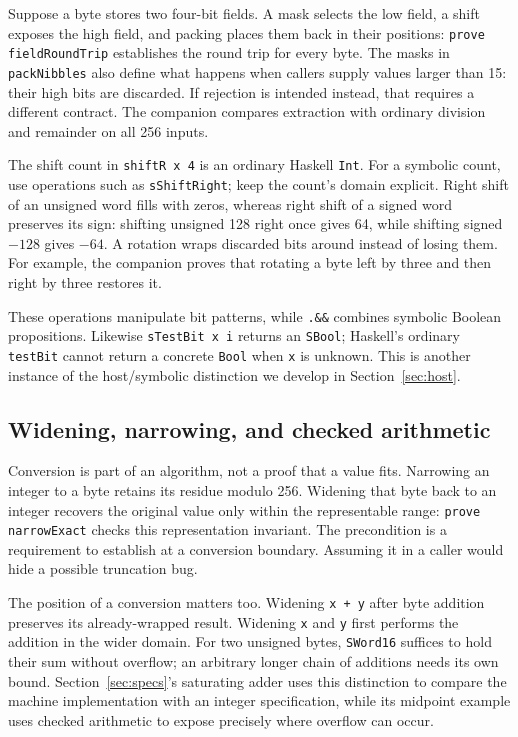 \documentclass[review]{jfp-epi}
\newcommand{\code}[1]{\texttt{#1}}
\begin{document}
Suppose a byte stores two four-bit fields. A mask selects the low field, a shift
exposes the high field, and packing places them back in their positions:
\code{prove fieldRoundTrip} establishes the round trip for every byte. The
masks in \code{packNibbles} also define what happens when callers supply values
larger than 15: their high bits are discarded. If rejection is intended instead,
that requires a different contract. The companion compares extraction with
ordinary division and remainder on all 256 inputs.

The shift count in \code{shiftR x 4} is an ordinary Haskell \code{Int}.
For a symbolic count, use operations such as \code{sShiftRight}; keep the
count's domain explicit. Right shift of an unsigned word fills with zeros,
whereas right shift of a signed word preserves its sign: shifting unsigned 128
right once gives 64, while shifting signed $-128$ gives $-64$.
A rotation wraps discarded bits around instead of losing them. For example,
the companion proves that rotating a byte left by three and then right by
three restores it.

These operations manipulate bit patterns, while \code{.\&\&} combines symbolic
Boolean propositions. Likewise \code{sTestBit x i} returns an \code{SBool};
Haskell's ordinary \code{testBit} cannot return a concrete \code{Bool} when
\code{x} is unknown. This is another instance of the host/symbolic distinction
we develop in Section~\ref{sec:host}.


\subsection{Widening, narrowing, and checked arithmetic}
\label{sec:bit-representations}

Conversion is part of an algorithm, not a proof that a value fits. Narrowing an
integer to a byte retains its residue modulo 256. Widening that byte back to an
integer recovers the original value only within the representable range:
\code{prove narrowExact} checks this representation invariant. The precondition
is a requirement to establish at a conversion boundary. Assuming it in a
caller would hide a possible truncation bug.

The position of a conversion matters too. Widening \code{x + y} after byte
addition preserves its already-wrapped result. Widening \code{x} and \code{y}
first performs the addition in the wider domain. For two unsigned bytes,
\code{SWord16} suffices to hold their sum without overflow; an arbitrary longer
chain of additions needs its own bound. Section~\ref{sec:specs}'s saturating
adder uses this distinction to compare the machine implementation with an
integer specification, while its midpoint example uses checked arithmetic to
expose precisely where overflow can occur.
\end{document}
